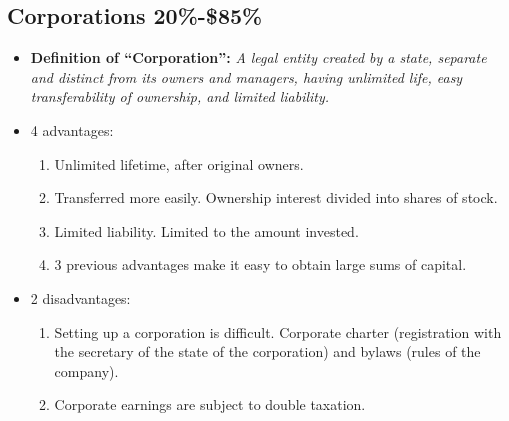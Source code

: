 \documentclass{article}
\renewcommand{\termdefinition}[2]{
    \textbf{Definition of ``#1'':} \emph{#2}
}
\begin{document}
\subsection{Corporations 20\%-\$85\%}
\begin{itemize}
    \item \termdefinition{Corporation}{ A legal entity created by a state, separate and distinct from its owners and managers, having unlimited life, easy transferability of ownership, and limited liability. }
    \item 4 advantages:
        \begin{enumerate}
            \item Unlimited lifetime, after original owners. 
            \item Transferred more easily. Ownership interest divided into shares of stock. 
            \item Limited liability. Limited to the amount invested. 
            \item 3 previous advantages make it easy to obtain large sums of capital. 
        \end{enumerate}
    
    \item 2 disadvantages:
        \begin{enumerate}
            \item Setting up a corporation is difficult. Corporate charter (registration with the secretary of the state of the corporation) and bylaws (rules of the company).
            \item Corporate earnings are subject to double taxation.
        \end{enumerate}
\end{itemize}
\end{document}
